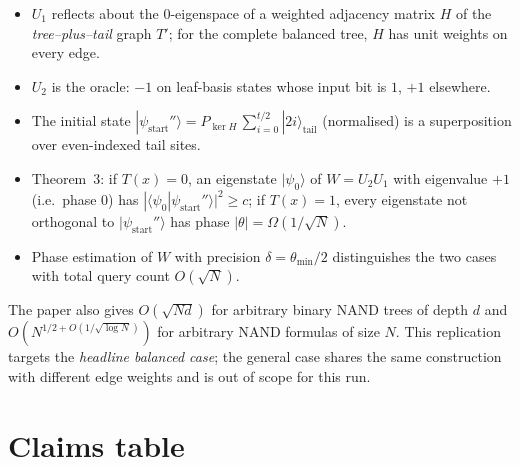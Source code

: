 \documentclass[11pt]{article}
\begin{document}
\begin{itemize}
\item $U_1$ reflects about the $0$-eigenspace of a weighted adjacency matrix $H$ of the
      \emph{tree--plus--tail} graph $T'$; for the complete balanced tree, $H$ has unit weights on
      every edge.
\item $U_2$ is the oracle: $-1$ on leaf-basis states whose input bit is $1$, $+1$ elsewhere.
\item The initial state $|\psi_{\text{start}}''\rangle = P_{\ker H}\, \sum_{i=0}^{t/2} |2i\rangle_{\text{tail}}$
      (normalised) is a superposition over even-indexed tail sites.
\item Theorem~3: if $T(x)=0$, an eigenstate $|\psi_0\rangle$ of $W = U_2 U_1$ with eigenvalue $+1$
      (i.e.\ phase $0$) has $|\langle \psi_0 | \psi_{\text{start}}''\rangle|^2 \ge c$;
      if $T(x)=1$, every eigenstate not orthogonal to $|\psi_{\text{start}}''\rangle$ has phase
      $|\theta| = \Omega(1/\sqrt N)$.
\item Phase estimation of $W$ with precision $\delta = \theta_{\min}/2$ distinguishes the two cases
      with total query count $O(\sqrt N)$.
\end{itemize}

The paper also gives $O(\sqrt{N d})$ for arbitrary binary NAND trees of depth $d$ and
$O(N^{1/2 + O(1/\sqrt{\log N})})$ for arbitrary NAND formulas of size $N$. This replication
targets the \emph{headline balanced case}; the general case shares the same construction
with different edge weights and is out of scope for this run.

\section{Claims table}
\end{document}
